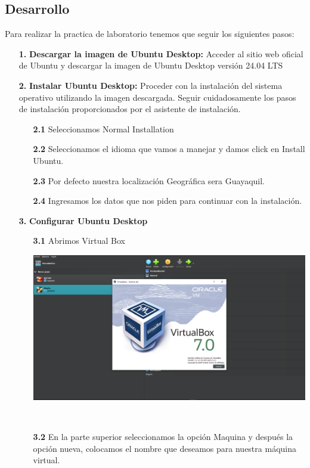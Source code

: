 \documentclass[11pt,twoside]{book}
\begin{document}
\subsection*{Desarrollo}
Para realizar la practica de laboratorio tenemos que seguir los siguientes pasos:
\begin{enumerate}
  \item[\textbf{1.}] \textbf{Descargar la imagen de Ubuntu Desktop:} Acceder al sitio web oficial de Ubuntu y descargar la imagen de Ubuntu Desktop versión 24.04 LTS
  \item[\textbf{2.}] \textbf{Instalar Ubuntu Desktop: } Proceder con la instalación del sistema operativo utilizando la imagen descargada. Seguir cuidadosamente los pasos de instalación proporcionados por el asistente de instalación.
  \begin{enumerate}
    \item[\textbf{2.1}] Seleccionamos Normal Installation 
    \item[\textbf{2.2}] Seleccionamos el idioma que vamos a manejar y damos click en Install Ubuntu.
    \item[\textbf{2.3}] Por defecto nuestra localización Geográfica sera Guayaquil.
        \item[\textbf{2.4}] Ingresamos los datos que nos piden para continuar con la instalación.\\
\end{enumerate}
\item[\textbf{3.}] \textbf{Configurar Ubuntu Desktop}
\begin{enumerate}
    \item[\textbf{3.1}] Abrimos Virtual Box
    
    \begin{minipage}{\linewidth}
        \centering
        \includegraphics[width=0.5\linewidth]{VB.png}
        \label{fig:etiqueta}
    \end{minipage}\\
    
    \item[\textbf{3.2}] En la parte superior seleccionamos la opción Maquina y después la opción nueva, colocamos el nombre que deseamos para nuestra máquina virtual.
    

\end{enumerate}
\end{enumerate}
\end{document}
